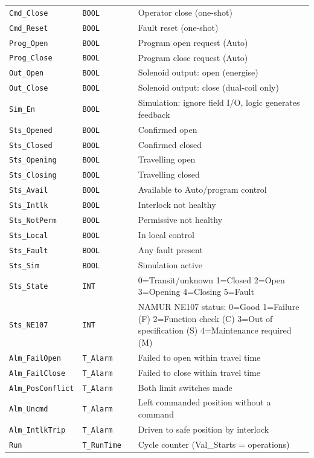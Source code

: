 \begin{small}
\begin{longtable}{@{}P{3.70cm}P{2.20cm}P{1.70cm}P{8.91cm}@{}}
\texttt{Cmd\_Close} & \texttt{BOOL} &  & Operator close (one-shot) \\
\texttt{Cmd\_Reset} & \texttt{BOOL} &  & Fault reset (one-shot) \\
\texttt{Prog\_Open} & \texttt{BOOL} &  & Program open request (Auto) \\
\texttt{Prog\_Close} & \texttt{BOOL} &  & Program close request (Auto) \\
\texttt{Out\_Open} & \texttt{BOOL} &  & Solenoid output: open (energise) \\
\texttt{Out\_Close} & \texttt{BOOL} &  & Solenoid output: close (dual-coil only) \\
\texttt{Sim\_En} & \texttt{BOOL} &  & Simulation: ignore field I/\allowbreak{}O, logic generates feedback \\
\texttt{Sts\_Opened} & \texttt{BOOL} &  & Confirmed open \\
\texttt{Sts\_Closed} & \texttt{BOOL} &  & Confirmed closed \\
\texttt{Sts\_Opening} & \texttt{BOOL} &  & Travelling open \\
\texttt{Sts\_Closing} & \texttt{BOOL} &  & Travelling closed \\
\texttt{Sts\_Avail} & \texttt{BOOL} &  & Available to Auto/\allowbreak{}program control \\
\texttt{Sts\_Intlk} & \texttt{BOOL} &  & Interlock not healthy \\
\texttt{Sts\_NotPerm} & \texttt{BOOL} &  & Permissive not healthy \\
\texttt{Sts\_Local} & \texttt{BOOL} &  & In local control \\
\texttt{Sts\_Fault} & \texttt{BOOL} &  & Any fault present \\
\texttt{Sts\_Sim} & \texttt{BOOL} &  & Simulation active \\
\texttt{Sts\_State} & \texttt{INT} &  & 0=Transit/\allowbreak{}unknown 1=Closed 2=Open 3=Opening 4=Closing 5=Fault \\
\texttt{Sts\_NE107} & \texttt{INT} &  & NAMUR NE107 status: 0=Good 1=Failure (F) 2=Function check (C) 3=Out of specification (S) 4=Maintenance required (M) \\
\texttt{Alm\_FailOpen} & \texttt{T\_Alarm} &  & Failed to open within travel time \\
\texttt{Alm\_FailClose} & \texttt{T\_Alarm} &  & Failed to close within travel time \\
\texttt{Alm\_PosConflict} & \texttt{T\_Alarm} &  & Both limit switches made \\
\texttt{Alm\_Uncmd} & \texttt{T\_Alarm} &  & Left commanded position without a command \\
\texttt{Alm\_IntlkTrip} & \texttt{T\_Alarm} &  & Driven to safe position by interlock \\
\texttt{Run} & \texttt{T\_RunTime} &  & Cycle counter (Val\_Starts = operations) \\
\bottomrule
\end{longtable}
\end{small}

